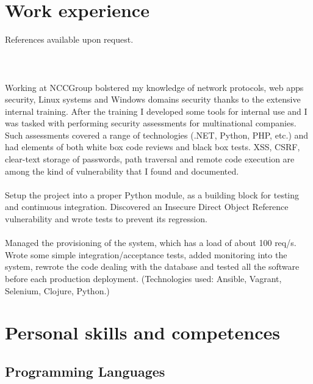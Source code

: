 \documentclass[helvetica,narrow,english,booktabs,a4paper]{moderncv}
\begin{document}
  \makecvtitle

  \section{Work experience}
  References available upon request.
  \\
  \\
  \leavevmode\\
  \\
  Working at NCCGroup bolstered my knowledge of network protocols, web apps security, Linux systems and Windows domains security thanks to the extensive internal training. After the training I developed some tools for internal use and I was tasked with performing security assessments for multinational companies. Such assessments covered a range of technologies (.NET, Python, PHP, etc.) and had elements of both white box code reviews and black box tests. XSS, CSRF, clear-text storage of passwords, path traversal and remote code execution are among the kind of vulnerability that I found and documented.
  \\
  \\
  Setup the project into a proper Python module, as a building block for testing and continuous integration. Discovered an Insecure Direct Object Reference vulnerability and wrote tests to prevent its regression.
  \\
  \\
  Managed the provisioning of the system, which has a load of about 100 req/s. Wrote some simple integration/acceptance tests, added monitoring into the system, rewrote the code dealing with the database and tested all the software before each production deployment. (Technologies used: Ansible, Vagrant, Selenium, Clojure, Python.)

  \section{Personal skills and competences}
  \subsection{Programming Languages}
\end{document}
